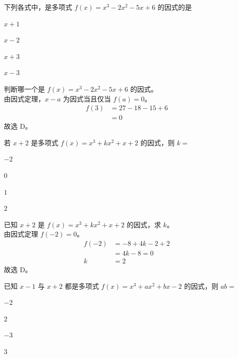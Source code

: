 \documentclass{exam-zh}
\begin{document}
\setcounter{question}{0}

\begin{question}
    下列各式中，是多项式 $f(x)=x^3-2x^2-5x+6$ 的因式的是 \paren[D]
    \begin{choices}
        \item $x+1$
        \item $x-2$
        \item $x+3$
        \item $x-3$
    \end{choices}
\end{question}

\begin{solution}
    判断哪一个是 $f(x)=x^3-2x^2-5x+6$ 的因式。 \\
    由因式定理，$x-a$ 为因式当且仅当 $f(a)=0$。
    \begin{align*}
        f(3) &= 27-18-15+6 \\
        &= 0
    \end{align*}
    故选 D。
\end{solution}

\begin{question}
    若 $x+2$ 是多项式 $f(x)=x^3+kx^2+x+2$ 的因式，则 $k=$ \paren[D]
    \begin{choices}
        \item $-2$
        \item $0$
        \item $1$
        \item $2$
    \end{choices}
\end{question}

\begin{solution}
    已知 $x+2$ 是 $f(x)=x^3+kx^2+x+2$ 的因式，求 $k$。 \\
    由因式定理 $f(-2)=0$。
    \begin{align*}
        f(-2) &= -8+4k-2+2 \\
        &= 4k-8 = 0 \\
        k &= 2
    \end{align*}
    故选 D。
\end{solution}

\begin{question}
    已知 $x-1$ 与 $x+2$ 都是多项式 $f(x)=x^3+ax^2+bx-2$ 的因式，则 $ab=$ \paren[A]
    \begin{choices}
        \item $-2$
        \item $2$
        \item $-3$
        \item $3$
    \end{choices}
\end{question}
\end{document}
